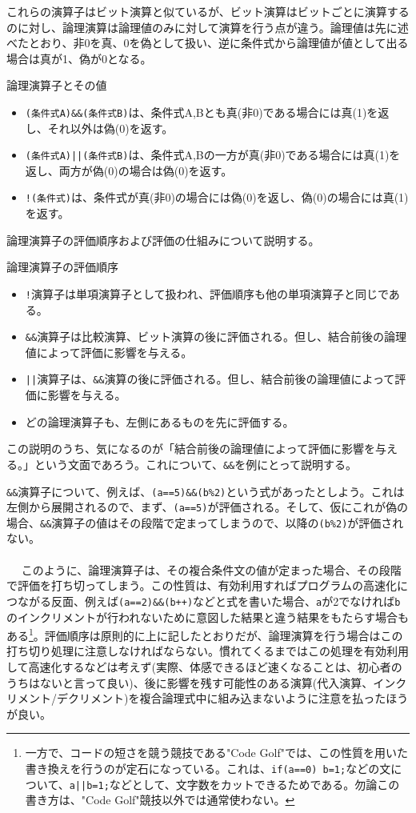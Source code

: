これらの演算子はビット演算と似ているが、ビット演算はビットごとに演算するのに対し、論理演算は論理値のみに対して演算を行う点が違う。論理値は先に述べたとおり、非0を真、0を偽として扱い、逆に条件式から論理値が値として出る場合は真が1、偽が0となる。
\begin{itembox}[l]{論理演算子とその値}
\begin{itemize}
\item \verb|(条件式A)&&(条件式B)|は、条件式A,Bとも真(非0)である場合には真(1)を返し、それ以外は偽(0)を返す。
\item \verb'(条件式A)||(条件式B)'は、条件式A,Bの一方が真(非0)である場合には真(1)を返し、両方が偽(0)の場合は偽(0)を返す。
\item \verb|!(条件式)|は、条件式が真(非0)の場合には偽(0)を返し、偽(0)の場合には真(1)を返す。
\end{itemize}
\end{itembox}

論理演算子の評価順序および評価の仕組みについて説明する。
\begin{itembox}[l]{論理演算子の評価順序}
\begin{itemize}
\item \verb|!|演算子は単項演算子として扱われ、評価順序も他の単項演算子と同じである。
\item \verb|&&|演算子は比較演算、ビット演算の後に評価される。但し、結合前後の論理値によって評価に影響を与える。
\item \verb'||'演算子は、\verb|&&|演算の後に評価される。但し、結合前後の論理値によって評価に影響を与える。
\item どの論理演算子も、左側にあるものを先に評価する。
\end{itemize}
\end{itembox}

この説明のうち、気になるのが「結合前後の論理値によって評価に影響を与える。」という文面であろう。これについて、\verb|&&|を例にとって説明する。

\verb|&&|演算子について、例えば、\verb|(a==5)&&(b%2)|という式があったとしよう。これは左側から展開されるので、まず、\verb|(a==5)|が評価される。そして、仮にこれが偽の場合、\verb|&&|演算子の値はその段階で定まってしまうので、以降の\verb|(b%2)|が評価されない。
\\ \\　
このように、論理演算子は、その複合条件文の値が定まった場合、その段階で評価を打ち切ってしまう。この性質は、有効利用すればプログラムの高速化につながる反面、例えば\verb|(a==2)&&(b++)|などと式を書いた場合、\verb|a|が2でなければ\verb|b|のインクリメントが行われないために意図した結果と違う結果をもたらす場合もある\footnote{一方で、コードの短さを競う競技である"Code Golf"では、この性質を用いた書き換えを行うのが定石になっている。これは、\verb|if(a==0) b=1;|などの文について、\verb'a||b=1;'などとして、文字数をカットできるためである。勿論この書き方は、"Code Golf"競技以外では通常使わない。}。評価順序は原則的に上に記したとおりだが、論理演算を行う場合はこの打ち切り処理に注意しなければならない。慣れてくるまではこの処理を有効利用して高速化するなどは考えず(実際、体感できるほど速くなることは、初心者のうちはないと言って良い)、後に影響を残す可能性のある演算(代入演算、インクリメント/デクリメント)を複合論理式中に組み込まないように注意を払ったほうが良い。


